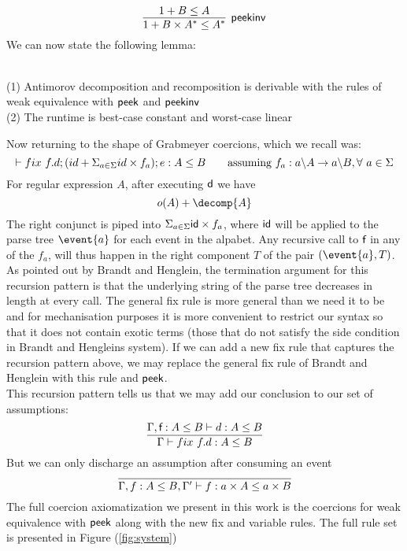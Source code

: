 \documentclass[a4paper,UKenglish,cleveref, autoref, thm-restate]{lipics-v2021}
\begin{document}
\[ \infer[\dslcom{peekinv}]{ 1 + B \times A^* \leq A^*}{1 + B \leq A} \]
We can now state the following lemma:
\begin{lemma}
\noindent \\
(1) Antimorov decomposition and recomposition is derivable with the rules of weak equivalence with $\textsf{peek}$ and $\textsf{peekinv}$\\
(2) The runtime is best-case constant and worst-case linear
\end{lemma}
Now returning to the shape of Grabmeyer coercions, which we recall was:
\[
\contains{}{\fix ~f.d;(id + \Sigma_{a \in \Sigma} id\times f_a); e}{A}{B} \qquad \text{assuming }f_a : \derive{a}{A} \rightarrow \derive{a}{B}, \forall ~ a \in \Sigma \]
For regular expression $A$, after executing $\textsf{d}$ we have 
\[ \myo{A} + \decomp{A} \]
The right conjunct is piped into $\Sigma_{a \in \Sigma} \textsf{id}\times f_a$, where $\textsf{id}$ will be applied to the parse tree $\event{a}$ for each event in the alpabet. Any recursive call to $\textsf{f}$ in any of the $f_a$, will thus happen in the right component $T$ of the pair $(\event{a},T)$. As pointed out by Brandt and Henglein, the termination argument for this recursion pattern is that the underlying string of the parse tree decreases in length at every call. The general fix rule is more general than we need it to be and for mechanisation purposes it is more convenient to restrict our syntax so that it does not contain exotic terms (those that do not satisfy the side condition in Brandt and Hengleins system).
If we can add a new fix rule that captures the recursion pattern above, we may replace the general fix rule of Brandt and Henglein with this rule and $\textsf{peek}$.\\
This recursion pattern tells us that we may add our conclusion to our set of assumptions:
\[\infer{\contains{\Gamma}{\fix ~f.d}{A}{B}}{ \contains{\Gamma, \dslcom{f}: A \leq B}{d}{A}{B}}
\]
But we can only discharge an assumption after consuming an event
\[\infer{\contains{\Gamma, f : A \leq B, \Gamma'}{f}{a \times A}{a \times B}}{}
\]
The full coercion axiomatization we present in this work is the coercions for weak equivalence with $\textsf{peek}$ along with the new fix and variable rules. The full rule set is presented in Figure (\ref{fig:system})
\end{document}
